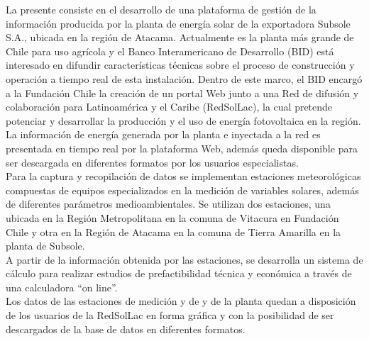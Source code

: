La presente consiste en el desarrollo de una plataforma de gestión de la información producida por la planta de energía solar de la exportadora Subsole S.A., ubicada en la región de Atacama.
Actualmente es la planta más grande de Chile para uso agrícola y el Banco Interamericano de Desarrollo (BID) está interesado en difundir características técnicas sobre el proceso de construcción y operación a tiempo real de esta instalación.
Dentro de este marco, el BID encargó a la Fundación Chile la creación de un portal Web junto a una Red de difusión y colaboración para Latinoamérica y el Caribe (RedSolLac), la cual pretende potenciar y desarrollar la producción y el uso de energía fotovoltaica en la región.\\

La información de energía generada por la planta e inyectada a la red es presentada en tiempo real por la plataforma Web, además queda disponible para ser descargada en diferentes formatos por los usuarios especialistas.\\

Para la captura y recopilación de datos se implementan estaciones meteorológicas compuestas de equipos especializados en la medición de variables solares, además de diferentes parámetros medioambientales. Se utilizan dos estaciones, una ubicada en la Región Metropolitana en la comuna de Vitacura en Fundación Chile y otra en la Región de Atacama en la comuna de Tierra Amarilla en la planta de Subsole.\\

A partir de la información obtenida por las estaciones, se desarrolla un sistema de cálculo para realizar estudios de prefactibilidad técnica y económica a través de una calculadora “on line”.\\
Los datos de las estaciones de medición y de y de la planta quedan a disposición de los usuarios de la RedSolLac en forma gráfica y con la posibilidad de ser descargados de la base de datos en diferentes formatos.
